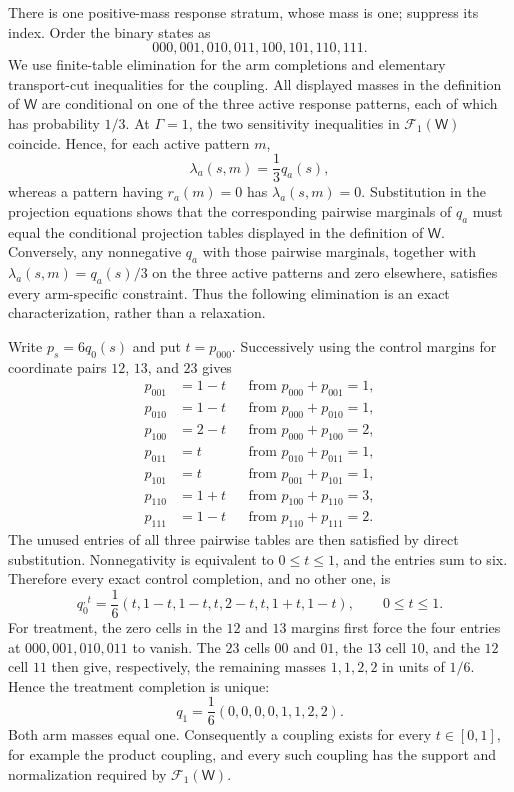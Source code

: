 There is one positive-mass response stratum, whose mass is one; suppress its index.  Order the binary states as
\[
000,001,010,011,100,101,110,111.
\]
We use finite-table elimination for the arm completions and elementary transport-cut inequalities for the coupling.  All displayed masses in the definition of \(\mathsf W\) are conditional on one of the three active response patterns, each of which has probability \(1/3\).  At \(\Gamma=1\), the two sensitivity inequalities in \(\mathcal F_1(\mathsf W)\) coincide.  Hence, for each active pattern \(m\),
\[
\lambda_a(s,m)=\frac{1}{3}q_a(s),
\]
whereas a pattern having \(r_a(m)=0\) has \(\lambda_a(s,m)=0\).  Substitution in the projection equations shows that the corresponding pairwise marginals of \(q_a\) must equal the conditional projection tables displayed in the definition of \(\mathsf W\).  Conversely, any nonnegative \(q_a\) with those pairwise marginals, together with \(\lambda_a(s,m)=q_a(s)/3\) on the three active patterns and zero elsewhere, satisfies every arm-specific constraint.  Thus the following elimination is an exact characterization, rather than a relaxation.

Write \(p_s=6q_0(s)\) and put \(t=p_{000}\).  Successively using the control margins for coordinate pairs \(12\), \(13\), and \(23\) gives
\[
\begin{aligned}
p_{001}&=1-t &&\text{from }p_{000}+p_{001}=1,\\
p_{010}&=1-t &&\text{from }p_{000}+p_{010}=1,\\
p_{100}&=2-t &&\text{from }p_{000}+p_{100}=2,\\
p_{011}&=t   &&\text{from }p_{010}+p_{011}=1,\\
p_{101}&=t   &&\text{from }p_{001}+p_{101}=1,\\
p_{110}&=1+t &&\text{from }p_{100}+p_{110}=3,\\
p_{111}&=1-t &&\text{from }p_{110}+p_{111}=2.
\end{aligned}
\]
The unused entries of all three pairwise tables are then satisfied by direct substitution.  Nonnegativity is equivalent to \(0\le t\le1\), and the entries sum to six.  Therefore every exact control completion, and no other one, is
\[
q_0^{,t}=\frac{1}{6}(t,1-t,1-t,t,2-t,t,1+t,1-t),
\qquad 0\le t\le1.
\]
For treatment, the zero cells in the \(12\) and \(13\) margins first force the four entries at \(000,001,010,011\) to vanish.  The \(23\) cells \(00\) and \(01\), the \(13\) cell \(10\), and the \(12\) cell \(11\) then give, respectively, the remaining masses \(1,1,2,2\) in units of \(1/6\).  Hence the treatment completion is unique:
\[
q_1=\frac{1}{6}(0,0,0,0,1,1,2,2).
\]
Both arm masses equal one.  Consequently a coupling exists for every \(t\in[0,1]\), for example the product coupling, and every such coupling has the support and normalization required by \(\mathcal F_1(\mathsf W)\).


